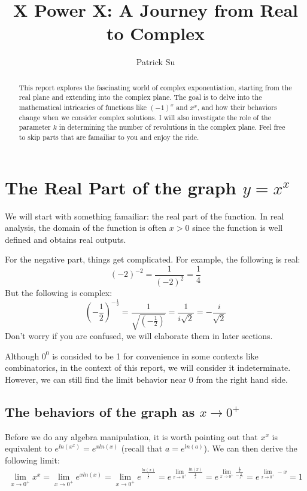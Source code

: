 \documentclass[12pt]{article}
\title{X Power X: A Journey from Real to Complex}
\author{Patrick Su}
\begin{document}
\maketitle

\begin{abstract}

This report explores the fascinating world of complex exponentiation, starting from the real plane and extending into the complex plane. 
The goal is to delve into the mathematical intricacies of functions like $(-1)^x$ and $x^x$, and how their behaviors change when we consider complex solutions. 
I will also investigate the role of the parameter $k$ in determining the number of revolutions in the complex plane.
Feel free to skip parts that are famailiar to you and enjoy the ride.
\end{abstract}

\section[Math in Section]{The Real Part of the graph $y = x^x$}

We will start with something famailiar: the real part of the function. In real analysis, the domain of the function is often $x>0$ since the function is well defined and obtains real outputs.

For the negative part, things get complicated. For example, the following is real: \[ (-2)^{-2} = \frac{1}{(-2)^2} = \frac{1}{4} \]
But the following is complex: \[(-\frac{1}{2})^{-\frac{1}{2}} = \frac{1}{\sqrt{(-\frac{1}{2})}} = \frac{1}{i\sqrt{2}} = -\frac{i}{\sqrt{2}}\]
Don't worry if you are confused, we will elaborate them in later sections.

Although $0^0$ is consided to be 1 for convenience in some contexts like combinatorics, in the context of this report, we will consider it indeterminate. 
However, we can still find the limit behavior near 0 from the right hand side.
\subsection[Math in Subsection]{The behaviors of the graph as $x \rightarrow 0^{+}$}
Before we do any algebra manipulation, it is worth pointing out that $x^x$ is equivalent to $e^{ln(x^x)}=e^{xln(x)}$ (recall that $a=e^{ln(a)}$). We can then derive the following limit:
\[ \lim_{{x \to 0^+}} x^x = \lim_{{x \to 0^+}} e^{xln(x)} = \lim_{{x \to 0^+}} e^{\frac{ln(x)}{\frac{1}{x}}} 
= e^{\lim_{{x \to 0^+}} \frac{ln(x)}{\frac{1}{x}}} = e^{\lim_{{x \to 0^+}} \frac{\frac{1}{x}}{-\frac{1}{x^2}}}
= e^{\lim_{{x \to 0^+}} -x} = 1\]
\end{document}

